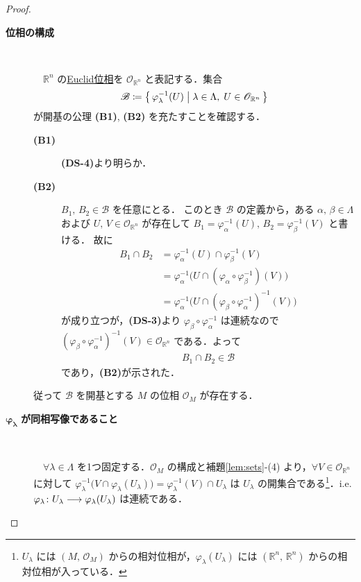 \documentclass[geometry_main]{subfiles}
\begin{document}
\begin{proof}
    \begin{description}
		\item[\textbf{位相の構成}]　
		
		　$\mathbb{R}^n$ の\hyperref[thm.metrictopo]{Euclid位相}を $\mathscr{O}_{\mathbb{R}^n}$ と表記する．集合
		\begin{align}
			\mathscr{B} \coloneqq \bigl\{\, \varphi_\lambda^{-1}(U) \bigm| \lambda \in \Lambda,\; U \in \mathscr{O}_{\mathbb{R}^n} \,\bigr\} 
		\end{align}
		が開基の公理 \textsf{\textbf{(B1)}}, \textsf{\textbf{(B2)}} を充たすことを確認する．
		\begin{description}
			\item[\textbf{(B1)}] \textsf{\textbf{(DS-4)}}より明らか．
			\item[\textbf{(B2)}] $B_1,\, B_2 \in \mathscr{B}$ を任意にとる．
			このとき $\mathscr{B}$ の定義から，ある $\alpha,\, \beta \in \Lambda$ および $U,\, V \in \mathscr{O}_{\mathbb{R}^n}$ が存在して $B_1 = \varphi_\alpha^{-1}(U),\, B_2 = \varphi_\beta^{-1}(V)$ と書ける．
			故に
			\begin{align}
				B_1 \cap B_2 &= \varphi_\alpha^{-1}(U) \cap \varphi_\beta^{-1}(V) \\
				&= \varphi_\alpha^{-1} \bigl( U \cap (\varphi_\alpha \circ \varphi_\beta^{-1})(V) \bigr) \\
				&= \varphi_\alpha^{-1} \bigl( U \cap (\varphi_\beta \circ \varphi_\alpha^{-1})^{-1}(V) \bigr)
			\end{align}
			が成り立つが，\textsf{\textbf{(DS-3)}}より $\varphi_\beta \circ \varphi_\alpha^{-1}$ は連続なので $(\varphi_\beta \circ \varphi_\alpha^{-1})^{-1}(V) \in \mathscr{O}_{\mathbb{R}^n}$ である．よって
			\begin{align}
				B_1 \cap B_2 \in \mathscr{B}
			\end{align}
			であり，\textsf{\textbf{(B2)}}が示された．
		\end{description}
		従って $\mathscr{B}$ を開基とする $M$ の位相 $\mathscr{O}_M$ が存在する．
		\item[$\bm{\varphi_\lambda}$ \textbf{が同相写像であること}]　
		
		　$\forall \lambda \in \Lambda$ を1つ固定する．$\mathscr{O}_M$ の構成と補題\ref{lem:sets}-(4) より，$\forall V \in \mathscr{O}_{\mathbb{R}^n}$ に対して
		$\varphi_\lambda^{-1}\bigl( V \cap \varphi_\lambda(U_\lambda) \bigr) = \varphi_\lambda^{-1}(V) \cap U_\lambda$ は $U_\lambda$ の開集合である\footnote{$U_\lambda$ には $(M,\,\mathscr{O}_M)$ からの相対位相が，$\varphi_\lambda(U_\lambda)$ には $(\mathbb{R}^n,\, \mathbb{R}^n)$ からの相対位相が入っている．}．i.e. $\varphi_\lambda \colon U_\lambda \longrightarrow \varphi_\lambda(U_\lambda)$ は連続である．
		

\end{description}
\end{proof}
\end{document}
